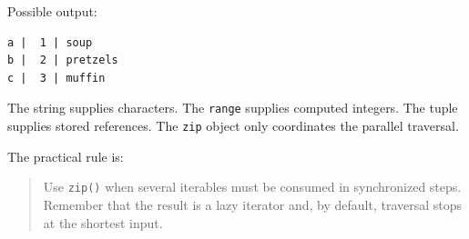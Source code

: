 Possible output:

\begin{verbatim}
a |  1 | soup
b |  2 | pretzels
c |  3 | muffin
\end{verbatim}

The string supplies characters. The \texttt{range} supplies computed integers. The tuple supplies stored references. The \texttt{zip} object only coordinates the parallel traversal.

The practical rule is:

\begin{quote}
Use \texttt{zip()} when several iterables must be consumed in synchronized steps. Remember that the result is a lazy iterator and, by default, traversal stops at the shortest input.
\end{quote}